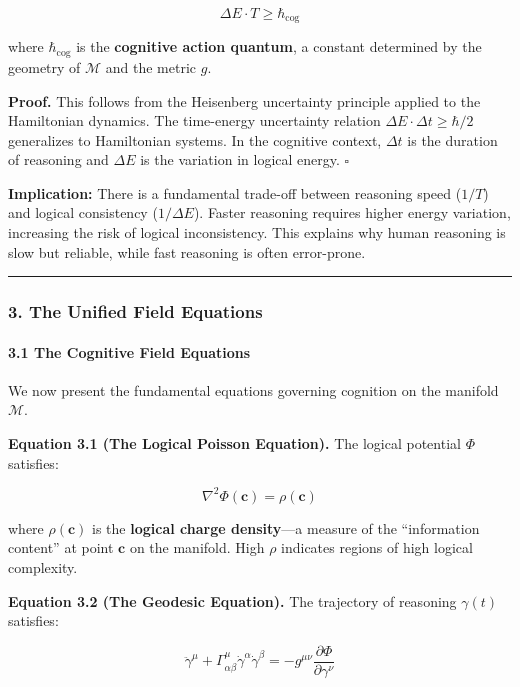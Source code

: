 \documentclass[
  11pt,
  a4paper,
]{article}
\begin{document}
\[\Delta E \cdot T \geq \hbar_{\text{cog}}\]

where \(\hbar_{\text{cog}}\) is the \textbf{cognitive action quantum}, a
constant determined by the geometry of \(\mathcal{M}\) and the metric
\(g\).

\textbf{Proof.} This follows from the Heisenberg uncertainty principle
applied to the Hamiltonian dynamics. The time-energy uncertainty
relation \(\Delta E \cdot \Delta t \geq \hbar/2\) generalizes to
Hamiltonian systems. In the cognitive context, \(\Delta t\) is the
duration of reasoning and \(\Delta E\) is the variation in logical
energy. \(\square\)

\textbf{Implication:} There is a fundamental trade-off between reasoning
speed (\(1/T\)) and logical consistency (\(1/\Delta E\)). Faster
reasoning requires higher energy variation, increasing the risk of
logical inconsistency. This explains why human reasoning is slow but
reliable, while fast reasoning is often error-prone.

\begin{center}\rule{0.5\linewidth}{0.5pt}\end{center}

\subsubsection{3. The Unified Field
Equations}\label{the-unified-field-equations}

\paragraph{3.1 The Cognitive Field
Equations}\label{the-cognitive-field-equations}

We now present the fundamental equations governing cognition on the
manifold \(\mathcal{M}\).

\textbf{Equation 3.1 (The Logical Poisson Equation).} The logical
potential \(\Phi\) satisfies:

\[\nabla^2 \Phi(\mathbf{c}) = \rho(\mathbf{c})\]

where \(\rho(\mathbf{c})\) is the \textbf{logical charge density}---a
measure of the ``information content'' at point \(\mathbf{c}\) on the
manifold. High \(\rho\) indicates regions of high logical complexity.

\textbf{Equation 3.2 (The Geodesic Equation).} The trajectory of
reasoning \(\gamma(t)\) satisfies:

\[\ddot{\gamma}^\mu + \Gamma^\mu_{\alpha\beta} \dot{\gamma}^\alpha \dot{\gamma}^\beta = -g^{\mu\nu} \frac{\partial \Phi}{\partial \gamma^\nu}\]
\end{document}
